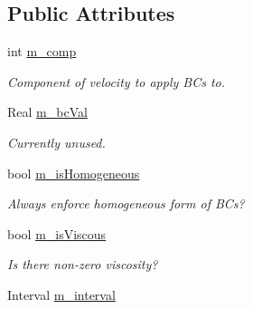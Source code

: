 \subsection*{Public Attributes}
\begin{DoxyCompactItemize}
\item 
\hypertarget{class_basic_c_c_vel_b_c_function_adeca967b84062f4242387b38461a8865}{int \hyperlink{class_basic_c_c_vel_b_c_function_adeca967b84062f4242387b38461a8865}{m\-\_\-comp}}\label{class_basic_c_c_vel_b_c_function_adeca967b84062f4242387b38461a8865}

\begin{DoxyCompactList}\small\item\em Component of velocity to apply B\-Cs to. \end{DoxyCompactList}\item 
\hypertarget{class_basic_c_c_vel_b_c_function_a252af4c47d5055d3b861f5e7353eec1e}{Real \hyperlink{class_basic_c_c_vel_b_c_function_a252af4c47d5055d3b861f5e7353eec1e}{m\-\_\-bc\-Val}}\label{class_basic_c_c_vel_b_c_function_a252af4c47d5055d3b861f5e7353eec1e}

\begin{DoxyCompactList}\small\item\em Currently unused. \end{DoxyCompactList}\item 
\hypertarget{class_basic_c_c_vel_b_c_function_ae7f9d35862d6f4d60b66a1cc2d471124}{bool \hyperlink{class_basic_c_c_vel_b_c_function_ae7f9d35862d6f4d60b66a1cc2d471124}{m\-\_\-is\-Homogeneous}}\label{class_basic_c_c_vel_b_c_function_ae7f9d35862d6f4d60b66a1cc2d471124}

\begin{DoxyCompactList}\small\item\em Always enforce homogeneous form of B\-Cs? \end{DoxyCompactList}\item 
\hypertarget{class_basic_c_c_vel_b_c_function_a58aac1d527fc1867d9dbff790b38609f}{bool \hyperlink{class_basic_c_c_vel_b_c_function_a58aac1d527fc1867d9dbff790b38609f}{m\-\_\-is\-Viscous}}\label{class_basic_c_c_vel_b_c_function_a58aac1d527fc1867d9dbff790b38609f}

\begin{DoxyCompactList}\small\item\em Is there non-\/zero viscosity? \end{DoxyCompactList}\item 
\hypertarget{class_basic_c_c_vel_b_c_function_a7697caeb1754d5cca737daff6dcb2445}{Interval \hyperlink{class_basic_c_c_vel_b_c_function_a7697caeb1754d5cca737daff6dcb2445}{m\-\_\-interval}}\label{class_basic_c_c_vel_b_c_function_a7697caeb1754d5cca737daff6dcb2445}


\end{DoxyCompactItemize}
